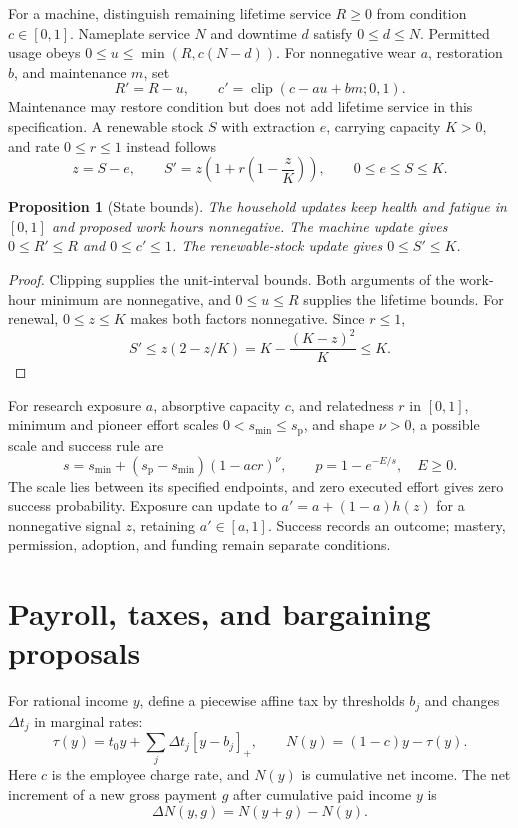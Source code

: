 \documentclass[11pt,a4paper]{article}
\newtheorem{proposition}[theorem]{Proposition}
\begin{document}
For a machine, distinguish remaining lifetime service $R\geq0$ from condition $c\in[0,1]$. Nameplate service $N$ and downtime $d$ satisfy $0\leq d\leq N$. Permitted usage obeys $0\leq u\leq\min(R,c(N-d))$. For nonnegative wear $a$, restoration $b$, and maintenance $m$, set
\begin{equation}
R'=R-u,\qquad c'=\operatorname{clip}(c-au+bm;0,1).
\end{equation}
Maintenance may restore condition but does not add lifetime service in this specification. A renewable stock $S$ with extraction $e$, carrying capacity $K>0$, and rate $0\leq r\leq1$ instead follows
\begin{equation}
z=S-e,\qquad S'=z\left(1+r\left(1-\frac zK\right)\right),
\qquad 0\leq e\leq S\leq K.
\end{equation}

\begin{proposition}[State bounds]
The household updates keep health and fatigue in $[0,1]$ and proposed work hours nonnegative. The machine update gives $0\leq R'\leq R$ and $0\leq c'\leq1$. The renewable-stock update gives $0\leq S'\leq K$.
\end{proposition}
\begin{proof}
Clipping supplies the unit-interval bounds. Both arguments of the work-hour minimum are nonnegative, and $0\leq u\leq R$ supplies the lifetime bounds. For renewal, $0\leq z\leq K$ makes both factors nonnegative. Since $r\leq1$,
\begin{equation}
S'\leq z(2-z/K)=K-\frac{(K-z)^2}{K}\leq K.
\end{equation}
\end{proof}

For research exposure $a$, absorptive capacity $c$, and relatedness $r$ in $[0,1]$, minimum and pioneer effort scales $0<s_{\min}\leq s_{\mathrm{p}}$, and shape $\nu>0$, a possible scale and success rule are
\begin{equation}
s=s_{\min}+(s_{\mathrm{p}}-s_{\min})(1-acr)^\nu,
\qquad p=1-e^{-E/s},\quad E\geq0.
\end{equation}
The scale lies between its specified endpoints, and zero executed effort gives zero success probability. Exposure can update to $a'=a+(1-a)h(z)$ for a nonnegative signal $z$, retaining $a'\in[a,1]$. Success records an outcome; mastery, permission, adoption, and funding remain separate conditions.

\section{Payroll, taxes, and bargaining proposals}
For rational income $y$, define a piecewise affine tax by thresholds $b_j$ and changes $\Delta t_j$ in marginal rates:
\begin{equation}
\tau(y)=t_0y+\sum_j\Delta t_j[y-b_j]_+,\qquad
N(y)=(1-c)y-\tau(y).
\end{equation}
Here $c$ is the employee charge rate, and $N(y)$ is cumulative net income. The net increment of a new gross payment $g$ after cumulative paid income $y$ is
\begin{equation}
\Delta N(y,g)=N(y+g)-N(y).
\end{equation}
\end{document}
